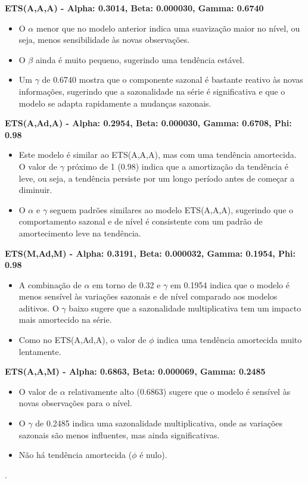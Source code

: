 \documentclass[a4paper, 12pt]{article}
\begin{document}
\textbf{ETS(A,A,A) - Alpha: 0.3014, Beta: 0.000030, Gamma: 0.6740}

\begin{itemize}
    \item O $\alpha$ menor que no modelo anterior indica uma suavização maior no nível, ou seja, menos sensibilidade às novas observações.
    \item O $\beta$ ainda é muito pequeno, sugerindo uma tendência estável.
    \item Um $\gamma$ de 0.6740 mostra que o componente sazonal é bastante reativo às novas informações, sugerindo que a sazonalidade na série é significativa e que o modelo se adapta rapidamente a mudanças sazonais.\\
\end{itemize}

\textbf{ETS(A,Ad,A) - Alpha: 0.2954, Beta: 0.000030, Gamma: 0.6708, Phi: 0.98}

\begin{itemize}
    \item Este modelo é similar ao ETS(A,A,A), mas com uma tendência amortecida. O valor de $\gamma$ próximo de 1 (0.98) indica que a amortização da tendência é leve, ou seja, a tendência persiste por um longo período antes de começar a diminuir.
    \item O $\alpha$ e $\gamma$ seguem padrões similares ao modelo ETS(A,A,A), sugerindo que o comportamento sazonal e de nível é consistente com um padrão de amortecimento leve na tendência.
\end{itemize}

\textbf{ETS(M,Ad,M) - Alpha: 0.3191, Beta: 0.000032, Gamma: 0.1954, Phi: 0.98}
\begin{itemize}
    \item A combinação de $\alpha$ em torno de 0.32 e $\gamma$ em 0.1954 indica que o modelo é menos sensível às variações sazonais e de nível comparado aos modelos aditivos. O $\gamma$ baixo sugere que a sazonalidade multiplicativa tem um impacto mais amortecido na série.
    \item Como no ETS(A,Ad,A), o valor de $\phi$ indica uma tendência amortecida muito lentamente.
\end{itemize}

\textbf{ETS(A,A,M) - Alpha: 0.6863, Beta: 0.000069, Gamma: 0.2485}
\begin{itemize}
    \item O valor de $\alpha$ relativamente alto (0.6863) sugere que o modelo é sensível às novas observações para o nível.
    \item O $\gamma$ de 0.2485 indica uma sazonalidade multiplicativa, onde as variações sazonais são menos influentes, mas ainda significativas.
    \item Não há tendência amortecida ($\phi$ é nulo).
\end{itemize} 
. \\\\
\end{document}
